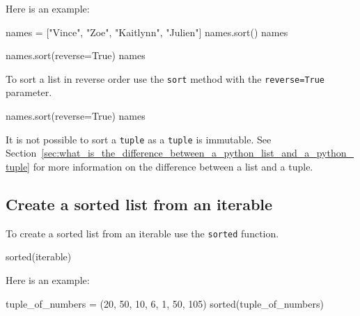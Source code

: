 Here is an example:




\begin{raw}
names = ["Vince", "Zoe", "Kaitlynn", "Julien"]
names.sort()
names
\end{raw}





\begin{pyin}
names.sort(reverse=True)
names
\end{pyin}





To sort a list in reverse order use the \texttt{sort} method with the \texttt{reverse=True}
parameter.




\begin{pyin}
names.sort(reverse=True)
names
\end{pyin}





\begin{raw}
\end{raw}






\begin{note}
It is not possible to sort a \texttt{tuple} as a \texttt{tuple} is immutable.
See
Section~\ref{sec:what_is_the_difference_between_a_python_list_and_a_python_tuple}
for more information on the difference between a list and a tuple.
\end{note}


\subsection{Create a sorted list from an iterable}
\label{\detokenize{building-tools/02-functions-and-data-structures/how/main:create-a-sorted-list-from-an-iterable}}

To create a sorted list from an iterable use the \texttt{sorted} function.


\begin{api}
sorted(iterable)
\end{api}



Here is an example:




\begin{pyin}
tuple_of_numbers = (20, 50, 10, 6, 1, 50, 105)
sorted(tuple_of_numbers)
\end{pyin}





